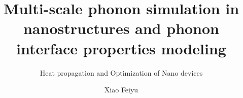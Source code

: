 \title{Multi-scale phonon simulation in nanostructures and phonon interface properties modeling}

\subtitle{Heat propagation and Optimization of Nano devices}

\author{Xiao Feiyu}








     



\renewcommand{\submissiontext}{This dissertation is submitted for the Open Research for Innovative Challenges }




